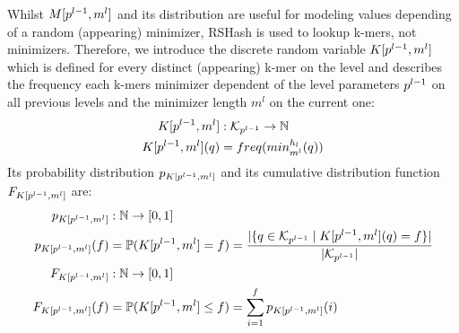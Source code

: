 \documentclass[a4paper,titlepage,onecolumn,oneside,12pt,nenglish,titlepage=firstiscover]{scrbook}
\theoremstyle{plain} %
\theoremstyle{definition} %
\theoremstyle{remark} %
\theoremstyle{plain}
\newcommand{\NN}{\mathbb{N}} %
\newcommand{\minimizerLength}{m}
\newcommand{\level}{l}
\newcommand{\kmer}{q}
\begin{document}
Whilst $\manualZV{M}{\levelParameters{\level-1}}{\minimizerLength^\level}$ and its distribution are useful for modeling values depending of a random (appearing) minimizer, RSHash is used to lookup k-mers, not minimizers. Therefore, we introduce the discrete random variable $\manualZV{K}{\levelParameters{\level-1}}{\minimizerLength^\level}$ which is defined for every distinct (appearing) k-mer on the level and describes the frequency each k-mers minimizer dependent of the level parameters $\levelParameters{\level-1}$ on all previous levels and the minimizer length $\minimizerLength^\level$ on the current one:
\begin{align}
	\manualZV{K}{\levelParameters{\level-1}}{\minimizerLength^\level} &: \distinctKmers{\level} \rightarrow \NN
	\\
	\manualZV{K}{\levelParameters{\level-1}}{\minimizerLength^\level}(\kmer) &= \frequencyOf{\minimizerOf{\kmer}{\level}}
\end{align}
Its probability distribution $\probabilityDistribution{\manualZV{K}{\levelParameters{\level-1}}{\minimizerLength^\level}}$ and its cumulative distribution function $\CDF{\manualZV{K}{\levelParameters{\level-1}}{\minimizerLength^\level}}$ are: 
\begin{align}
	\probabilityDistribution{\manualZV{K}{\levelParameters{\level-1}}{\minimizerLength^\level}} &: \NN \rightarrow [0,1]
	\\
	\probabilityDistribution{\manualZV{K}{\levelParameters{\level-1}}{\minimizerLength^\level}}(f) &= \mathbb{P}(\manualZV{K}{\levelParameters{\level-1}}{\minimizerLength^\level} = f) = \frac{|\{\kmer \in \distinctKmers{\level} \mid \manualZV{K}{\levelParameters{\level-1}}{\minimizerLength^\level}(\kmer)=f \}|}{|\distinctKmers{\level}|}
	\\
	\CDF{\manualZV{K}{\levelParameters{\level-1}}{\minimizerLength^\level}} &: \NN \rightarrow [0,1]\\
	\CDF{\manualZV{K}{\levelParameters{\level-1}}{\minimizerLength^\level}}(f) &= \mathbb{P}(\manualZV{K}{\levelParameters{\level-1}}{\minimizerLength^\level} \leq f) = \sum_{i=1}^f \probabilityDistribution{\manualZV{K}{\levelParameters{\level-1}}{\minimizerLength^\level}}(i)
\end{align}
\end{document}
